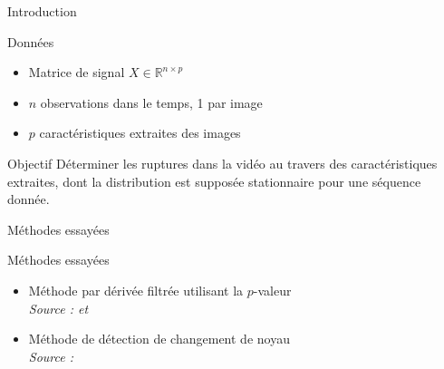 \begin{frame}{Introduction}

\begin{exampleblock}{Données}
\begin{itemize}
\item Matrice de signal $X \in \mathbb{R}^{n \times p}$
\item $n$ observations dans le temps, 1 par image
\item $p$ caractéristiques extraites des images
\end{itemize}
\end{exampleblock}

\begin{block}{Objectif}
Déterminer les ruptures dans la vidéo au travers des caractéristiques extraites, dont la distribution est supposée stationnaire pour une séquence donnée.
\end{block}

\end{frame}


\begin{frame}{Méthodes essayées}

\begin{alertblock}{Méthodes essayées}
\begin{itemize}
\item Méthode par dérivée filtrée utilisant la $p$-valeur\\
\textit{Source : \cite{Bertrand11} et \cite{Herault14}}
\item Méthode de détection de changement de noyau\\
\textit{Source : \cite{Desobry05}}
\end{itemize}
\end{alertblock}

\end{frame}


